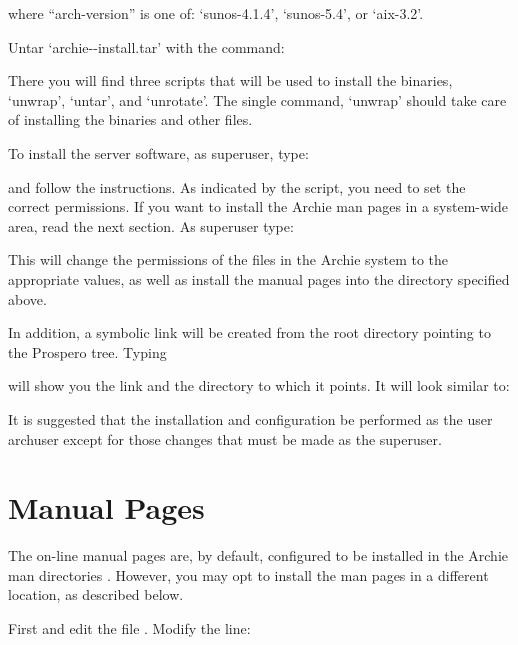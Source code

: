 where ``arch-version'' is one of: `sunos-4.1.4', `sunos-5.4', or `aix-3.2'.

Untar `archie-\version-install.tar' with the command:


There you will find three scripts that will be used to install the binaries,
`unwrap', `untar', and `unrotate'.  The single command, `unwrap' should take
care of installing the binaries and other files.


To install the server software, as superuser, type:


and follow the instructions. As indicated by the script, you need to
set the correct permissions. If you want to install the Archie man pages
in a system-wide area, read the next section. As superuser type:





This will change the permissions of the files in the Archie system to the
appropriate values, as well as install the manual pages into the directory
specified above.

In addition, a symbolic link will be created from the root directory pointing
to the Prospero tree. Typing


will show you the link and the directory to which it points. It will look
similar to:




It is suggested that the installation and configuration be performed as the
user archuser except for those changes that must be made as the superuser.



%
%

\section{Manual Pages}

The on-line manual pages are, by default, configured to be installed in the
Archie man directories .
However, you may opt to install the man pages in a different location,
as described below.

First
 and edit the file
. Modify the line:

